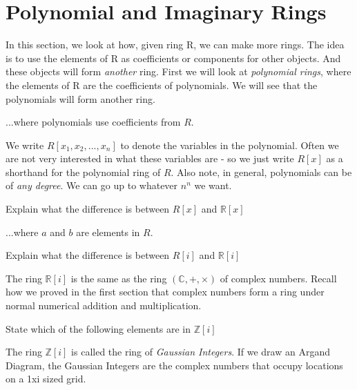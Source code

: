 \section{Polynomial and Imaginary Rings}

In this section, we look at how, given ring R, we can make more rings.
The idea is to use the elements of R as coefficients or components for other objects.
And these objects will form \textit{another} ring. First we will look at \textit{polynomial rings}, 
where the elements of R are the coefficients of polynomials. We will see that the polynomials 
will form another ring.



...where polynomials use coefficients from $R$. 

We write $R[x_1, x_2, ..., x_n]$ to denote the variables in the polynomial. Often we are not very 
interested in what these variables are - so we just write $R[x]$ as a shorthand for the 
polynomial ring of $R$. Also note, in general, polynomials can be of \textit{any degree}. 
We can go up to whatever $n^{n}$ we want. 

\begin{example}
Explain what the difference is between $R[x]$ and $\mathbb{R}[x]$ 
\end{example}





...where $a$ and $b$ are elements in $R$. 

\begin{example}
Explain what the difference is between $R[i]$ and $\mathbb{R}[i]$ 
\end{example}


The ring $\mathbb{R}[i]$ is the same as the ring $(\mathbb{C}, +, \times)$ of complex numbers. 
Recall how we proved in the first section that complex numbers form a ring under normal 
numerical addition and multiplication. 

\begin{example}
State which of the following elements are in $\mathbb{Z}[i]$ 
\end{example}

The ring $\mathbb{Z}[i]$ is called the ring of \textit{Gaussian Integers}. If we draw an Argand Diagram, 
the Gaussian Integers are the complex numbers that occupy locations on a 1xi sized grid. 


